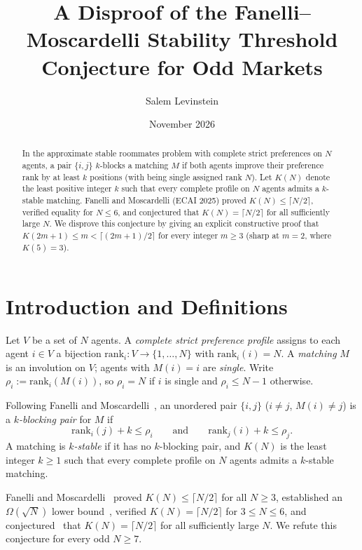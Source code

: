 \documentclass[11pt]{article}
\title{A Disproof of the Fanelli--Moscardelli Stability Threshold Conjecture for Odd Markets}
\author{Salem Levinstein}
\date{November 2026}
\begin{document}
\maketitle

\begin{abstract}
In the approximate stable roommates problem with complete strict preferences on $N$ agents, a pair $\{i,j\}$ $k$-blocks a matching $M$ if both agents improve their preference rank by at least $k$ positions (with being single assigned rank $N$). Let $K(N)$ denote the least positive integer $k$ such that every complete profile on $N$ agents admits a $k$-stable matching. Fanelli and Moscardelli (ECAI 2025) proved $K(N) \le \lceil N/2 \rceil$, verified equality for $N \le 6$, and conjectured that $K(N) = \lceil N/2 \rceil$ for all sufficiently large $N$. We disprove this conjecture by giving an explicit constructive proof that $K(2m+1) \le m < \lceil (2m+1)/2 \rceil$ for every integer $m \ge 3$ (sharp at $m=2$, where $K(5)=3$).
\end{abstract}

\section{Introduction and Definitions}

Let $V$ be a set of $N$ agents. A \emph{complete strict preference profile} assigns to each agent $i \in V$ a bijection $\mathrm{rank}_i : V \to \{1, \dots, N\}$ with $\mathrm{rank}_i(i) = N$. A \emph{matching} $M$ is an involution on $V$; agents with $M(i) = i$ are \emph{single}. Write $\rho_i := \mathrm{rank}_i(M(i))$, so $\rho_i = N$ if $i$ is single and $\rho_i \le N-1$ otherwise.

Following Fanelli and Moscardelli~\cite{FM25}, an unordered pair $\{i,j\}$ ($i \neq j$, $M(i) \neq j$) is a \emph{$k$-blocking pair} for $M$ if
\[
\mathrm{rank}_i(j) + k \le \rho_i \qquad \text{and} \qquad \mathrm{rank}_j(i) + k \le \rho_j.
\]
A matching is \emph{$k$-stable} if it has no $k$-blocking pair, and $K(N)$ is the least integer $k \ge 1$ such that every complete profile on $N$ agents admits a $k$-stable matching.

Fanelli and Moscardelli~\cite[Theorem~1]{FM25} proved $K(N) \le \lceil N/2 \rceil$ for all $N \ge 3$, established an $\Omega(\sqrt{N})$ lower bound~\cite[Theorem~3]{FM25}, verified $K(N) = \lceil N/2 \rceil$ for $3 \le N \le 6$, and conjectured~\cite[Section~5]{FM25} that $K(N) = \lceil N/2 \rceil$ for all sufficiently large $N$. We refute this conjecture for every odd $N \ge 7$.
\end{document}
